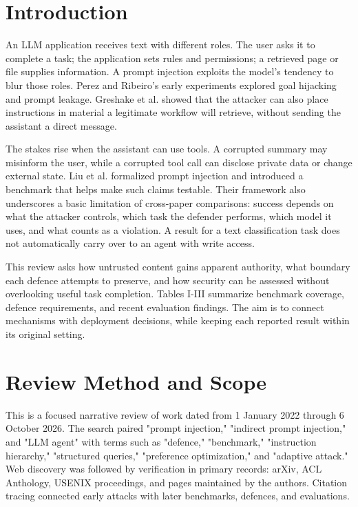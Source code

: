 \documentclass[conference]{IEEEtran}
\begin{document}
\section{Introduction}
An LLM application receives text with different roles. The user asks it to complete a task; the application sets rules and permissions; a retrieved page or file supplies information. A prompt injection exploits the model's tendency to blur those roles. Perez and Ribeiro's early experiments \cite{perez2022ignore} explored goal hijacking and prompt leakage. Greshake et al. \cite{greshake2023not} showed that the attacker can also place instructions in material a legitimate workflow will retrieve, without sending the assistant a direct message.

The stakes rise when the assistant can use tools. A corrupted summary may misinform the user, while a corrupted tool call can disclose private data or change external state. Liu et al. \cite{liu2024formalizing} formalized prompt injection and introduced a benchmark that helps make such claims testable. Their framework also underscores a basic limitation of cross-paper comparisons: success depends on what the attacker controls, which task the defender performs, which model it uses, and what counts as a violation. A result for a text classification task does not automatically carry over to an agent with write access.

This review asks how untrusted content gains apparent authority, what boundary each defence attempts to preserve, and how security can be assessed without overlooking useful task completion. Tables I-III summarize benchmark coverage, defence requirements, and recent evaluation findings. The aim is to connect mechanisms with deployment decisions, while keeping each reported result within its original setting.

\section{Review Method and Scope}
This is a focused narrative review of work dated from 1 January 2022 through 6 October 2026. The search paired "prompt injection," "indirect prompt injection," and "LLM agent" with terms such as "defence," "benchmark," "instruction hierarchy," "structured queries," "preference optimization," and "adaptive attack." Web discovery was followed by verification in primary records: arXiv, ACL Anthology, USENIX proceedings, and pages maintained by the authors. Citation tracing connected early attacks with later benchmarks, defences, and evaluations.
\end{document}

